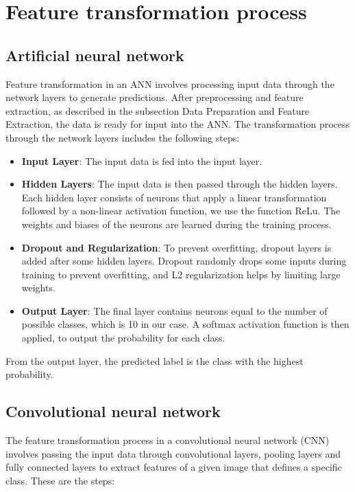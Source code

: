\section{Feature transformation process}

\subsection{Artificial neural network}

Feature transformation in an ANN involves processing input data through the network layers to generate predictions.
After preprocessing and feature extraction, as described in the subsection Data Preparation and Feature Extraction, the data is ready for input into the ANN. 
The transformation process through the network layers includes the following steps:
\begin{itemize}
    \item \textbf{Input Layer}: The input data is fed into the input layer.
    \item \textbf{Hidden Layers}: The input data is then passed through the hidden layers. Each hidden layer consists of neurons that apply a linear transformation followed by a non-linear activation function, we use the function ReLu. The weights and biases of the neurons are learned during the training process.
    \item \textbf{Dropout and Regularization}: To prevent overfitting, dropout layers is added after some hidden layers. Dropout randomly drops some inputs during training to prevent overfitting, and L2 regularization helps by limiting large weights.
    \item \textbf{Output Layer}: The final layer contains neurons equal to the number of possible classes, which is 10 in our case. A softmax activation function is then applied, to output the probability for each class.
\end{itemize}
From the output layer, the predicted label is the class with the highest probability.

\subsection{Convolutional neural network}

The feature transformation process in a convolutional neural network (CNN) involves passing the input data through convolutional layers, pooling layers and fully connected layers to extract features of a given image that defines a specific class. These are the steps:

